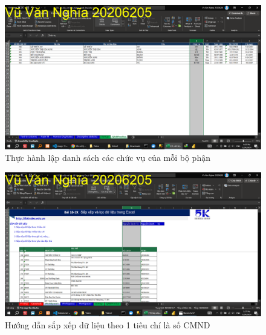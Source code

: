 \documentclass{article}
\begin{document}


\begin{figure}[h]
    \centering
    \includegraphics[scale = 0.15]{Video1/ThucHanh/6.png}
    \caption{Thực hành lập danh sách các chức vụ của mỗi bộ phận}
\end{figure}





\begin{figure}[h]
    \centering
    \includegraphics[scale = 0.15]{Video2/HuongDan/0.png}
    \caption{Hướng dẫn sắp xếp dữ liệu theo 1 tiêu chí là số CMND}
\end{figure}
\end{document}
